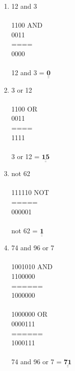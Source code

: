\documentclass[a4paper,10pt]{article}
\def\doubleunderline#1{\underline{\underline{#1}}}
\begin{document}
\begin{enumerate}
\item 12 and 3 \\ \\
	 {\color{ForestGreen}
		 1100 AND \\
		 0011 \\
		 ==== \\
		 0000 \\ \\
		 12 and 3 = $\mathbf{\doubleunderline{0}}$
	 }
\item 3 or 12 \\ \\
	 {\color{ForestGreen}
		 1100 OR \\
		 0011 \\
		 ==== \\
		 1111 \\ \\
		 3 or 12 = $\mathbf{\doubleunderline{15}}$
	 }
\item not 62 \\ \\
	 {\color{ForestGreen}
		 111110 NOT \\
		 ===== \\
		 000001 \\ \\
		 not 62 = $\mathbf{\doubleunderline{1}}$
	 }
\item 74 and 96 or 7 \\ \\
	 {\color{ForestGreen}
		 1001010 AND \\
		 1100000 \\
		 ====== \\
		 1000000 \\
		 \\
		 1000000 OR \\
		 0000111 \\
		 ====== \\
		 1000111 \\ \\
		 74 and 96 or 7 = $\mathbf{\doubleunderline{71}}$
	 }
\end{enumerate}
\end{document}
